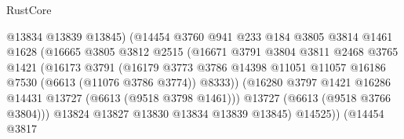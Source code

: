 \begin{lexlean}{RustCore}
\begin{coremodule}
                                      @13834
                                      @13839
                                      @13845)
                                    (@14454
                                      @3760
                                      @941
                                      @233
                                      @184
                                      @3805
                                      @3814
                                      @1461
                                      @1628
                                      (@16665
                                        @3805
                                        @3812
                                        @2515
                                        (@16671
                                          @3791
                                          @3804
                                          @3811
                                          @2468
                                          @3765
                                          @1421
                                          (@16173
                                            @3791
                                            (@16179
                                              @3773
                                              @3786
                                              @14398
                                              @11051
                                              @11057
                                              @16186
                                              @7530
                                              (@6613 (@11076 @3786 @3774))
                                              @8333))
                                          (@16280
                                            @3797
                                            @1421
                                            @16286
                                            @14431
                                            @13727
                                            (@6613 (@9518 @3798 @1461)))
                                          @13727
                                          (@6613 (@9518 @3766 @3804)))
                                        @13824
                                        @13827
                                        @13830
                                        @13834
                                        @13839
                                        @13845)
                                      @14525))
                                  (@14454
                                    @3817

\end{coremodule}
\end{lexlean}
